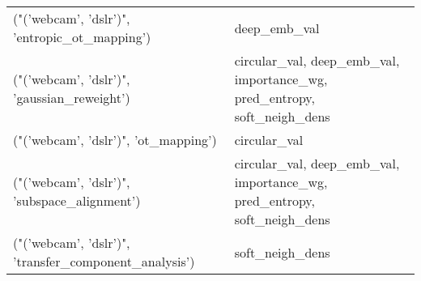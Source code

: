 \begin{tabular}{ll}
 ("('webcam', 'dslr')", 'entropic\_ot\_mapping')             & deep\_emb\_val                                                             \\
 ("('webcam', 'dslr')", 'gaussian\_reweight')               & circular\_val, deep\_emb\_val, importance\_wg, pred\_entropy, soft\_neigh\_dens \\
 ("('webcam', 'dslr')", 'ot\_mapping')                      & circular\_val                                                             \\
 ("('webcam', 'dslr')", 'subspace\_alignment')              & circular\_val, deep\_emb\_val, importance\_wg, pred\_entropy, soft\_neigh\_dens \\
 ("('webcam', 'dslr')", 'transfer\_component\_analysis')     & soft\_neigh\_dens                                                          \\
\hline
\end{tabular}